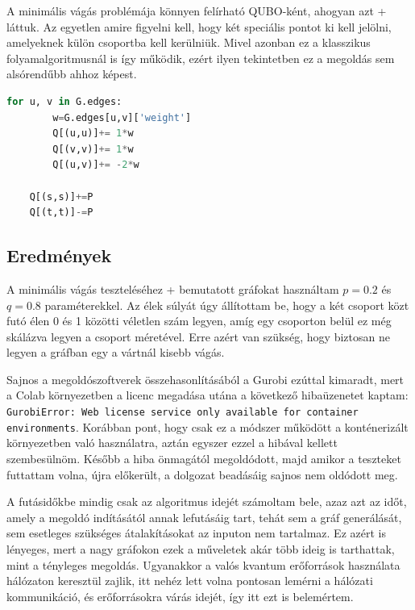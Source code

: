 A minimális vágás problémája könnyen felírható QUBO-ként, ahogyan azt \az+ láttuk. Az egyetlen amire figyelni kell, hogy két speciális pontot ki kell jelölni, amelyeknek külön csoportba kell kerülniük. Mivel azonban ez a klasszikus folyamalgoritmusnál is így működik, ezért ilyen tekintetben ez a megoldás sem alsórendűbb ahhoz képest.

\vspace{5pt}
\begin{lstlisting}[language=python,caption=Minimális vágás QUBO előállítása,label=code:minCutQUBO]
	for u, v in G.edges:
		w=G.edges[u,v]['weight']
		Q[(u,u)]+= 1*w
		Q[(v,v)]+= 1*w
		Q[(u,v)]+= -2*w
	
	Q[(s,s)]+=P
	Q[(t,t)]-=P
\end{lstlisting}


\subsection{Eredmények}

A minimális vágás teszteléséhez \az+ bemutatott gráfokat használtam $p=0.2$ és $q=0.8$ paraméterekkel. Az élek súlyát úgy állítottam be, hogy a két csoport közt futó élen 0 és 1 közötti véletlen szám legyen, amíg egy csoporton belül ez még skálázva legyen a csoport méretével. Erre azért van szükség, hogy biztosan ne legyen a gráfban egy a vártnál kisebb vágás.

Sajnos a megoldószoftverek összehasonlításából a Gurobi ezúttal kimaradt, mert a Colab környezetben a licenc megadása utána a következő hibaüzenetet kaptam: \verb+GurobiError: Web license service only available for container environments+.
Korábban pont, hogy csak ez a módszer működött a konténerizált környezetben való használatra, aztán egyszer ezzel a hibával kellett szembesülnöm. Később a hiba önmagától megoldódott, majd amikor a teszteket futtattam volna, újra előkerült, a dolgozat beadásáig sajnos nem oldódott meg.

A futásidőkbe mindig csak az algoritmus idejét számoltam bele, azaz azt az időt, amely a megoldó indításától annak lefutásáig tart, tehát sem a gráf generálását, sem esetleges szükséges átalakításokat az inputon nem tartalmaz. Ez azért is lényeges, mert a nagy gráfokon ezek a műveletek akár több ideig is tarthattak, mint a tényleges megoldás. Ugyanakkor a valós kvantum erőforrások használata hálózaton keresztül zajlik, itt nehéz lett volna pontosan lemérni a hálózati kommunikáció, és erőforrásokra várás idejét, így itt ezt is belemértem. 

